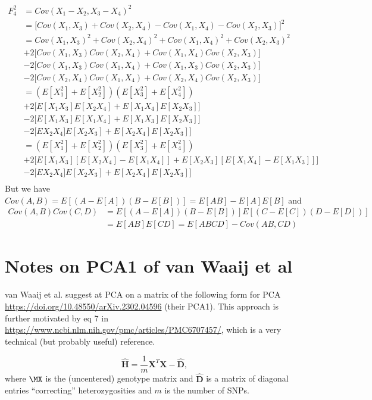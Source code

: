 \documentclass[12pt, letterpaper]{article}
\begin{document}
\begin{align}
    F_4^2 &=  Cov(X_1 - X_2, X_3 - X_4) ^2 \nonumber\\
    &= \big[ Cov(X_1, X_3) + Cov(X_2, X_4) - Cov(X_1, X_4) - Cov(X_2, X_3)   \big]^2\nonumber\\
    &= Cov(X_1, X_3)^2 + Cov(X_2, X_4)^2 + Cov(X_1, X_4)^2 + Cov(X_2, X_3)^2  \nonumber\\
    &+2 \big[ Cov(X_1, X_3) Cov(X_2, X_4) + Cov(X_1, X_4) Cov(X_2, X_3)\big] \nonumber\\
    &-2 \big[ Cov(X_1, X_3) Cov(X_1, X_4) + Cov(X_1, X_3) Cov(X_2, X_3)\big] \nonumber\\
    &-2 \big[ Cov(X_2, X_4) Cov(X_1, X_4) + Cov(X_2, X_4) Cov(X_2, X_3)\big] \\
    &= (E[X_1^2] + E[X_2^2])(E[X_3^2] + E[X_4^2]) \nonumber\\
    &+2 \big[ E[X_1X_3]E[X_2X_4] + E[X_1 X_4] E[X_2 X_3]\big] \nonumber\\
    &-2 \big[ E[X_1 X_3] E[X_1 X_4] + E[X_1 X_3] E[X_2 X_3]\big] \nonumber\\
    &-2 \big[ EX_2 X_4] E[X_2 X_3] + E[X_2 X_4] E[X_2 X_3]\big] \\
    &= (E[X_1^2] + E[X_2^2])(E[X_3^2] + E[X_4^2]) \nonumber\\
    &+2 \big[ E[X_1X_3]  [ E[X_2X_4] - E[X_1 X_4]] +  E[X_2 X_3] [ E[X_1 X_4]  - E[X_1 X_3] ]\big] \nonumber\\
    &-2 \big[ EX_2 X_4] E[X_2 X_3] + E[X_2 X_4] E[X_2 X_3]\big] \nonumber\\
\end{align}
But we have $Cov(A,B) = E[ (A-E[A])(B-E[B])] = E[AB] - E[A]E[B]$ and 
\begin{align}
Cov(A, B)Cov(C, D) &= E[ (A-E[A]) (B-E[B])] E[(C-E[C])(D-E[D])]\nonumber\\
&= E[AB]E[CD] =  E[ABCD] - Cov(AB, CD)
\end{align}

\newpage
\section{Notes on PCA1 of van Waaij et al}
van Waaij et al. suggest at PCA on a matrix of the following form for PCA
\url{https://doi.org/10.48550/arXiv.2302.04596} (their PCA1). This approach is further motivated by eq 7 in \url{https://www.ncbi.nlm.nih.gov/pmc/articles/PMC6707457/}, which is a very technical (but probably useful) reference.

\begin{equation}
    \hat{\mathbf{H}} = \frac{1}{m}\mathbf{X}^T\mathbf{X} - \hat{\mathbf{D}},
\end{equation}
where $\MX$ is the (uncentered) genotype matrix and $\hat{\mathbf{D}}$ is a matrix of diagonal entries ``correcting'' heterozygosities and $m$ is the number of SNPs.
\end{document}
